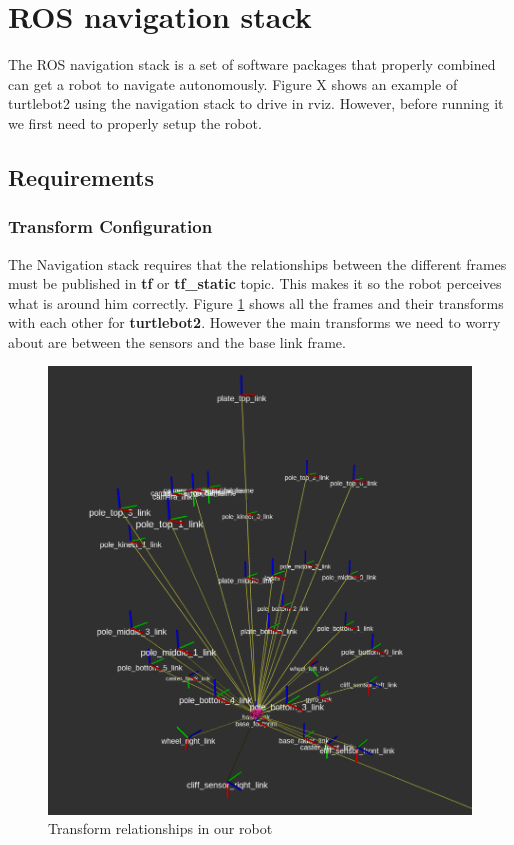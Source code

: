 \documentclass[12pt]{article}
\begin{document}
\section{ROS navigation stack}
The ROS navigation stack is a set of software packages that properly combined can get a robot to navigate autonomously.
Figure X  shows an example of turtlebot2 using the navigation stack to drive in rviz.
However, before running it we first need to properly setup the robot.
\subsection{Requirements}
\subsubsection{Transform Configuration}
The Navigation stack requires that the relationships between the different frames must be published in \textbf{tf} or \textbf{tf\_static} topic. This makes it so the robot perceives what is around him correctly.
Figure \ref{fig:tf} shows all the frames and their transforms with each other for \textbf{turtlebot2}. However the main transforms we need to worry about are between the sensors and the base link frame.
\begin{figure}[!htb]
    \centering
    \includegraphics[scale=0.2]{tf.png}
    \caption{Transform relationships in our robot}
    \label{fig:tf}
\end{figure}
\end{document}
